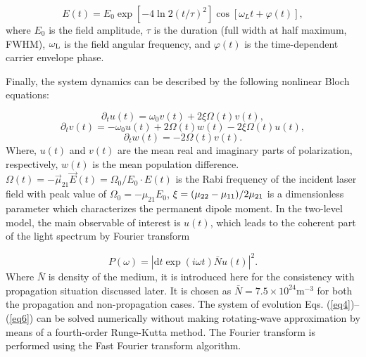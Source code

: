 \documentclass[10pt,letterpaper]{article}
\begin{document}
\begin{equation}
E(t) = {E_0}\exp \left[ { - 4\ln 2{{\left( {t/\tau } \right)}^2}} \right]\cos \left[ {{\omega _L}t + \varphi \left( t \right)} \right],
\label{eq3}
\end{equation}
where $ E_{0} $ is the field amplitude, $ \tau $ is the duration (full width at half maximum, FWHM), $ \omega_{\rm{L}} $ is the field angular frequency, and $ \varphi(t) $ is the time-dependent carrier envelope phase.

Finally, the system dynamics can be described by the following nonlinear Bloch equations:

\begin{equation}
 {\partial _t}{u}\left( {t} \right) = {\omega _0}{v}\left( t \right) + 2\xi \Omega \left( t \right){v}\left( t \right),
\label{eq4}
\end{equation}
\begin{equation}
{\partial _t}{v}\left( {t} \right) =  - {\omega _0}{u}\left( t \right) + 2\Omega \left( t \right){w}\left( t \right) - 2\xi \Omega \left( t \right){u}\left( t \right),
\label{eq5}
\end{equation}
\begin{equation}
{\partial _t}{w}\left( {t} \right) =  - 2\Omega \left( t \right){v}\left( t \right).
\label{eq6}
\end{equation}
Where, $ u(t) $ and $ v(t) $ are the mean real and imaginary parts of polarization, respectively, $ w(t) $ is the mean population difference. $\Omega\left( t \right) = - \vec{\mu}_{21}\vec{E}\left(t\right)=\Omega_{0}/E_{0}\cdot E\left(t\right)$ is the Rabi frequency of the incident laser field with peak value of ${\Omega _0} =  - {\mu _{21}}{E_0}$, $\xi  = {{\left( {{\mu _{22}} - {\mu _{11}}} \right)} \mathord{\left/{\vphantom {{\left( {{\mu _{22}} - {\mu _{11}}} \right)} {2{\mu _{21}}}}} \right.\kern-\nulldelimiterspace} {2{\mu _{21}}}}$ is a dimensionless parameter which characterizes the permanent dipole moment. In the two-level model, the main observable of interest is $u(t)$, which leads to the coherent part of the light spectrum by Fourier transform

\begin{equation}
P(\omega)= \left| \textrm{d}t\exp(i\omega t)\bar{N}u(t)\right|^2.
\label{eq7}
\end{equation}
Where $ \bar{N} $ is density of the medium, it is introduced here for the consistency with propagation situation discussed later. It is chosen as $ \bar{N}=7.5\times10^{24} \textrm{m}^{-3}$ for both the propagation and non-propagation cases. The system of evolution Eqs. (\ref{eq4})--(\ref{eq6}) can be solved numerically without making rotating-wave approximation by means of a fourth-order Runge-Kutta method. The Fourier transform is performed using the Fast Fourier transform algorithm.
\end{document}
